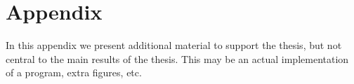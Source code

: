 

\chapter{Appendix}

In this appendix we present additional material to support the thesis, but not central to the main results of the thesis.  This may be an actual implementation of a program, extra figures, etc.




